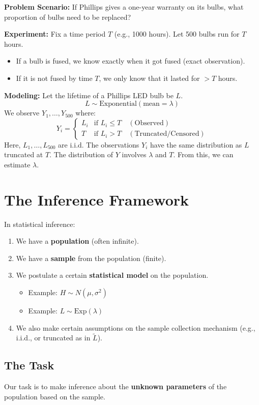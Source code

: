 \documentclass[12pt, a4paper]{article}
\theoremstyle{definition}
\begin{document}
\textbf{Problem Scenario:}
If Phillips gives a one-year warranty on its bulbs, what proportion of bulbs need to be replaced?

\textbf{Experiment:}
Fix a time period $T$ (e.g., 1000 hours). Let 500 bulbs run for $T$ hours.
\begin{itemize}
    \item If a bulb is fused, we know exactly when it got fused (exact observation).
    \item If it is not fused by time $T$, we only know that it lasted for $> T$ hours.
\end{itemize}

\textbf{Modeling:}
Let the lifetime of a Phillips LED bulb be $L$.
$$ L \sim \text{Exponential}(\text{mean} = \lambda) $$
We observe $Y_1, \dots, Y_{500}$ where:
$$
Y_i = 
\begin{cases} 
L_i & \text{if } L_i \le T \quad (\text{Observed}) \\
T & \text{if } L_i > T \quad (\text{Truncated/Censored})
\end{cases}
$$
Here, $L_1, \dots, L_{500}$ are i.i.d. The observations $Y_i$ have the same distribution as $L$ truncated at $T$. The distribution of $Y$ involves $\lambda$ and $T$. From this, we can estimate $\lambda$.

\section{The Inference Framework}
In statistical inference:
\begin{enumerate}
    \item We have a \textbf{population} (often infinite).
    \item We have a \textbf{sample} from the population (finite).
    \item We postulate a certain \textbf{statistical model} on the population.
    \begin{itemize}
        \item Example: $H \sim N(\mu, \sigma^2)$
        \item Example: $L \sim \text{Exp}(\lambda)$
    \end{itemize}
    \item We also make certain assumptions on the sample collection mechanism (e.g., i.i.d., or truncated as in $\tilde{L}$).
\end{enumerate}

\subsection*{The Task}
Our task is to make inference about the \textbf{unknown parameters} of the population based on the sample.
\end{document}
